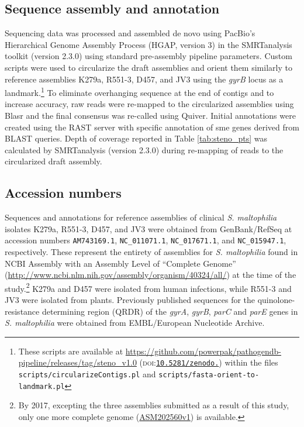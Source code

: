 \subsection{Sequence assembly and annotation}

Sequencing data was processed and assembled de novo using PacBio’s Hierarchical Genome Assembly Process\autocite{Chin2013} (HGAP, version 3) in the SMRTanalysis toolkit (version 2.3.0) using standard pre-assembly pipeline parameters. Custom scripts were used to circularize the draft assemblies and orient them similarly to reference assemblies K279a, R551-3, D457, and JV3 using the \emph{gyrB} locus as a landmark.\footnote{These scripts are available at \url{https://github.com/powerpak/pathogendb-pipeline/releases/tag/steno\_v1.0} (\textsc{doi}:\href{http://dx.doi.org/10.5281/zenodo.17295}{\texttt{10.5281/\allowbreak zenodo.}}) within the files \texttt{scripts/circularizeContigs.pl} and \texttt{scripts/fasta-orient-to-landmark.pl}} To eliminate overhanging sequence at the end of contigs and to increase accuracy, raw reads were re-mapped to the circularized assemblies using Blasr and the final consensus was re-called using Quiver. Initial annotations were created using the RAST server\autocite{Overbeek2014} with specific annotation of sme genes derived from BLAST queries.
Depth of coverage reported in Table \ref{tab:steno_pts} was calculated by SMRTanalysis (version 2.3.0) during re-mapping of reads to the circularized draft assembly.

\subsection{Accession numbers}

Sequences and annotations for reference assemblies of clinical \emph{S. maltophilia} isolates K279a, R551-3, D457, and JV3 were obtained from GenBank/RefSeq at accession numbers \texttt{AM743169.1}, \texttt{NC\_011071.1}, \texttt{NC\_017671.1}, and \texttt{NC\_015947.1}, respectively. These represent the entirety of assemblies for \emph{S. maltophilia} found in NCBI Assembly with an Assembly Level of “Complete Genome” (\url{http://www.ncbi.nlm.nih.gov/assembly/organism/40324/all/}) at the time of the study.\footnote{By 2017, excepting the three assemblies submitted as a result of this study, only one more complete genome (\href{https://www.ncbi.nlm.nih.gov/assembly/GCF\_002025605.1/}{ASM202560v1}) is available.} K279a and D457 were isolated from human infections, while R551-3 and JV3 were isolated from plants. Previously published sequences for the quinolone-resistance determining region (QRDR) of the \emph{gyrA}, \emph{gyrB}, \emph{parC} and \emph{parE} genes in \emph{S. maltophilia}\autocite{Valdezate2002} were obtained from EMBL/European Nucleotide Archive.

